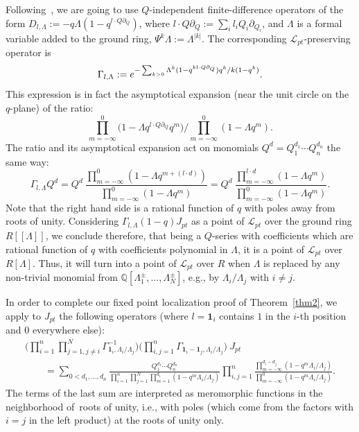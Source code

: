 \documentclass[11pt]{article}
\numberwithin{equation}{section}
\numberwithin{equation}{section}
\def\L{\mathcal L}
\def\1{\mathbf 1}
\def\QQ{\mathbb Q}
\def\p{\partial}
\begin{document}
Following~\cite{Givental:perm4}, we are going to use $Q$-independent finite-difference operators of the form $D_{l,\Lambda}:=-q \Lambda (1-q^{l\cdot Q\p_Q})$, where $l\cdot Q\p_Q:=\sum_i l_iQ_i\p_{Q_i}$, and $\Lambda$ is a formal variable added to the ground ring, $\Psi^k\Lambda:=\Lambda^{|k|}$. The corresponding $\L_{pt}$-preserving operator is
\[
\Gamma_{l,\Lambda}:= {\rm e}^{ -\sum_{k>0}\Lambda^k
(1-q^{kl\cdot Q\p_Q})q^k/k(1-q^k)}.
\]
This expression is in fact the asymptotical expansion (near the unit circle on the $q$-plane) of the ratio:
\[
\prod_{m=-\infty}^0\big(1-\Lambda q^{l\cdot Q\p_Q}q^m\big)/ \prod_{m=-\infty}^0(1-\Lambda q^m).
\]
The ratio and its asymptotical expansion act on monomials $Q^d=Q_1^{d_1}\cdots Q_n^{d_n}$ the same way:
\[
\Gamma_{l,\Lambda}Q^d= Q^d\ \frac{\prod_{m=-\infty}^0(1-\Lambda q^{m+(l\cdot d)})}{\prod_{m=-\infty}^0(1-\Lambda q^m)} = Q^d\ \frac{\prod_{m=-\infty}^{l\cdot d}(1-\Lambda q^m)}{\prod_{m=-\infty}^0(1-\Lambda q^m)}.
\]
Note that the right hand side is a rational function of $q$ with poles away from roots of unity. Considering $\Gamma_{l,\Lambda}(1-q)J_{pt}$ as a point of $\L_{pt}$ over the ground ring $R[[\Lambda]]$, we conclude therefore, that being a $Q$-series with coefficients which are rational function of $q$ with coefficients polynomial in $\Lambda$, it is a point of $\L_{pt}$ over $R[\Lambda]$. Thus, it will turn into a point of $\L_{pt}$ over $R$ when $\Lambda$ is replaced by any non-trivial monomial from $\QQ[\Lambda_1^{\pm},\dots,\Lambda_N^{\pm}]$, e.g., by $\Lambda_i/\Lambda_j$ with $i\neq j$.

In order to complete our fixed point localization proof of Theorem~\ref{thm2}, we apply to $J_{pt}$ the following operators (where $l=\1_i$ contains $1$ in the $i$-th position and $0$ everywhere else):
\begin{gather*}
\bigg(\prod_{i=1}^n\prod_{j=1, j\neq i}^N \Gamma^{-1}_{\1_i,\Lambda_i/\Lambda_j}\bigg) \bigg(\prod_{i,j=1}^n\Gamma_{\1_i-\1_j,\Lambda_i/\Lambda_j}\bigg)\ J_{pt}
\\ \qquad
{}=\sum_{0<d_1,\dots,d_n}\frac{Q_1^{d_1}\cdots Q_n^{d_n}}{\prod_{i=1}^n\prod_{j=1}^N\prod_{m=1}^{d_i}(1-q^m\Lambda_i/\Lambda_j)} \prod_{i,j=1}^n\frac{\prod_{m=-\infty}^{d_i-d_j}(1-q^m\Lambda_i/\Lambda_j)}{\prod_{m=-\infty}^0(1-q^m\Lambda_i/\Lambda_j)}.
\end{gather*}
The terms of the last sum are interpreted as meromorphic functions in the neighborhood of~roots of unity, i.e., with poles (which come from the factors with $i=j$ in the left product) at the roots of unity only.
\end{document}
